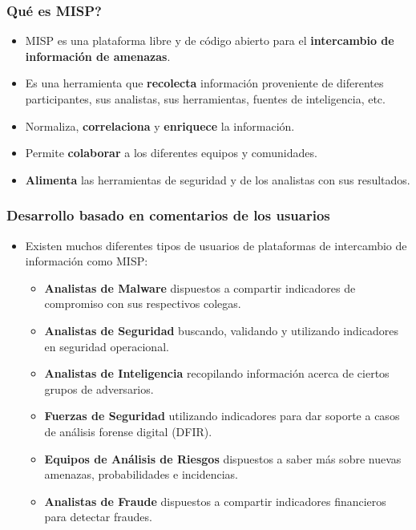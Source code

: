 \begin{frame}
\frametitle{Qué es MISP?}
\begin{itemize}
       \item MISP es una plataforma libre y de código abierto para el {\bf intercambio de información de amenazas}.
       \item Es una herramienta que {\bf recolecta} información proveniente de diferentes participantes, sus analistas, sus herramientas, fuentes de inteligencia, etc.
       \item Normaliza, {\bf correlaciona} y {\bf enriquece} la información.
       \item Permite {\bf colaborar} a los diferentes equipos y comunidades.
       \item {\bf Alimenta} las herramientas de seguridad y de los analistas con sus resultados.
\end{itemize}
\end{frame}

\begin{frame}
\frametitle{Desarrollo basado en comentarios de los usuarios}
\begin{itemize}
\item Existen muchos diferentes tipos de usuarios de plataformas de intercambio de información como MISP: 
        \begin{itemize}
                \item {\bf Analistas de Malware} dispuestos a compartir indicadores de compromiso con sus respectivos colegas.
                \item {\bf Analistas de Seguridad} buscando, validando y utilizando indicadores en seguridad operacional.
                \item {\bf Analistas de Inteligencia} recopilando información acerca de ciertos grupos de adversarios.
                \item {\bf Fuerzas de Seguridad} utilizando indicadores para dar soporte a casos de análisis forense digital (DFIR).
                \item {\bf Equipos de Análisis de Riesgos} dispuestos a saber más sobre nuevas amenazas, probabilidades e incidencias.
                \item {\bf Analistas de Fraude} dispuestos a compartir indicadores financieros para detectar fraudes.
        \end{itemize}
\end{itemize}
\end{frame}

